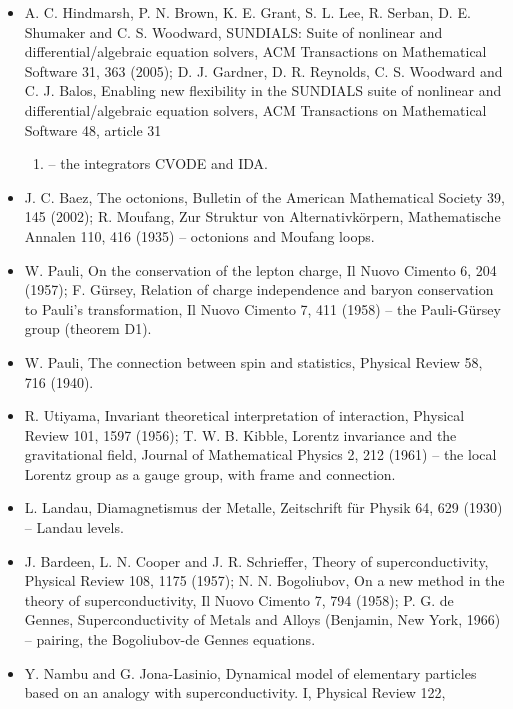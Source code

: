 \documentclass[
  10pt,
]{article}
\providecommand{\tightlist}{%
  \setlength{\itemsep}{0pt}\setlength{\parskip}{0pt}}
\begin{document}
\begin{itemize}
\item
  A. C. Hindmarsh, P. N. Brown, K. E. Grant, S. L. Lee, R. Serban, D. E.
  Shumaker and C. S. Woodward, SUNDIALS: Suite of nonlinear and
  differential/algebraic equation solvers, ACM Transactions on
  Mathematical Software 31, 363 (2005); D. J. Gardner, D. R. Reynolds,
  C. S. Woodward and C. J. Balos, Enabling new flexibility in the
  SUNDIALS suite of nonlinear and differential/algebraic equation
  solvers, ACM Transactions on Mathematical Software 48, article 31

  \begin{enumerate}
  \def\labelenumi{(\arabic{enumi})}
  \setcounter{enumi}{2021}
  \tightlist
  \item
    -- the integrators CVODE and IDA.
  \end{enumerate}
\item
  J. C. Baez, The octonions, Bulletin of the American Mathematical
  Society 39, 145 (2002); R. Moufang, Zur Struktur von
  Alternativkörpern, Mathematische Annalen 110, 416 (1935) -- octonions
  and Moufang loops.
\item
  W. Pauli, On the conservation of the lepton charge, Il Nuovo Cimento
  6, 204 (1957); F. Gürsey, Relation of charge independence and baryon
  conservation to Pauli's transformation, Il Nuovo Cimento 7, 411 (1958)
  -- the Pauli-Gürsey group (theorem D1).
\item
  W. Pauli, The connection between spin and statistics, Physical Review
  58, 716 (1940).
\item
  R. Utiyama, Invariant theoretical interpretation of interaction,
  Physical Review 101, 1597 (1956); T. W. B. Kibble, Lorentz invariance
  and the gravitational field, Journal of Mathematical Physics 2, 212
  (1961) -- the local Lorentz group as a gauge group, with frame and
  connection.
\item
  L. Landau, Diamagnetismus der Metalle, Zeitschrift für Physik 64, 629
  (1930) -- Landau levels.
\item
  J. Bardeen, L. N. Cooper and J. R. Schrieffer, Theory of
  superconductivity, Physical Review 108, 1175 (1957); N. N. Bogoliubov,
  On a new method in the theory of superconductivity, Il Nuovo Cimento
  7, 794 (1958); P. G. de Gennes, Superconductivity of Metals and Alloys
  (Benjamin, New York, 1966) -- pairing, the Bogoliubov-de Gennes
  equations.
\item
  Y. Nambu and G. Jona-Lasinio, Dynamical model of elementary particles
  based on an analogy with superconductivity. I, Physical Review 122,

\end{itemize}
\end{document}
